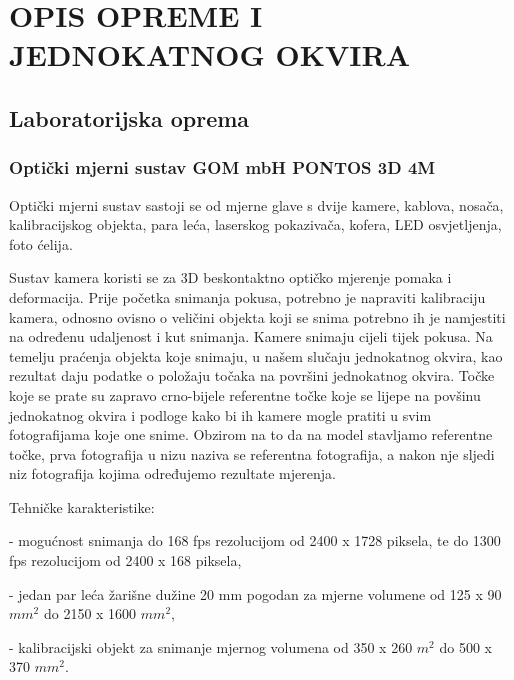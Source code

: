 \documentclass[12pt]{book}
\begin{document}
\chapter{\uppercase{Opis opreme i jednokatnog okvira}}

\section{Laboratorijska oprema}

\subsection{Opti\v cki mjerni sustav GOM mbH PONTOS 3D 4M}

Optički mjerni sustav sastoji se od mjerne glave s dvije kamere, kablova, nosača, kalibracijskog objekta, para leća, laserskog pokazivača, kofera, LED osvjetljenja, foto ćelija.

Sustav kamera koristi se za 3D beskontaktno optičko mjerenje pomaka i deformacija. Prije početka snimanja pokusa, potrebno je napraviti kalibraciju kamera, odnosno ovisno o veličini objekta koji se snima potrebno ih je namjestiti na određenu udaljenost i kut snimanja. Kamere snimaju cijeli tijek pokusa. Na temelju praćenja objekta koje snimaju, u našem slučaju jednokatnog okvira, kao rezultat daju podatke o položaju točaka na površini jednokatnog okvira. Točke koje se prate su zapravo crno-bijele referentne točke koje se lijepe na povšinu jednokatnog okvira i podloge kako bi ih kamere mogle pratiti u svim fotografijama koje one snime. Obzirom na to da na model stavljamo referentne točke, prva fotografija u nizu naziva se referentna fotografija, a nakon nje sljedi niz fotografija kojima određujemo rezultate mjerenja.

Tehničke karakteristike:

- mogućnost snimanja do 168 fps rezolucijom od 2400 x 1728 piksela, te do 1300 fps rezolucijom od 2400 x 168 piksela,

- jedan par leća žarišne dužine 20 mm pogodan za mjerne volumene od 125 x 90 $mm^2$ do 2150 x 1600 $mm^2$,

- kalibracijski objekt za snimanje mjernog volumena od 350 x 260 $m^2$ do 500 x 370 $mm^2$. \cite{oprema}
\end{document}
